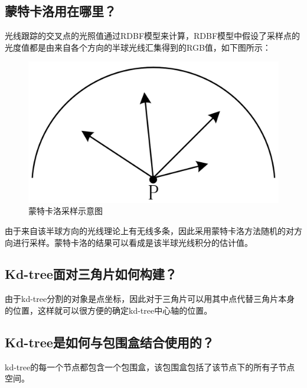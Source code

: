 \documentclass[10pt]{article}
\begin{document}
\subsection{蒙特卡洛用在哪里？}
光线跟踪的交叉点的光照值通过RDBF模型来计算，RDBF模型中假设了采样点的光度值都是由来自各个方向的半球光线汇集得到的RGB值，如下图所示：
\begin{figure}[H]
\begin{center}
\includegraphics[scale=0.25]{monte_carlo_sample.png}
\caption{蒙特卡洛采样示意图}
\end{center}
\end{figure}
由于来自该半球方向的光线理论上有无线多条，因此采用蒙特卡洛方法随机的对方向进行采样。蒙特卡洛的结果可以看成是该半球光线积分的估计值。
\subsection{Kd-tree面对三角片如何构建？}
由于kd-tree分割的对象是点坐标，因此对于三角片可以用其中点代替三角片本身的位置，这样就可以很方便的确定kd-tree中心轴的位置。
\subsection{Kd-tree是如何与包围盒结合使用的？}
kd-tree的每一个节点都包含一个包围盒，该包围盒包括了该节点下的所有子节点空间。
\end{document}
